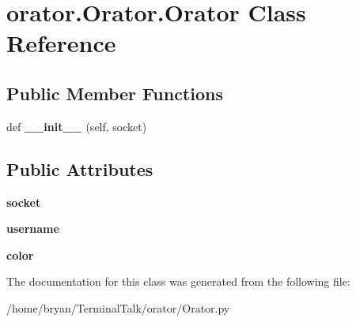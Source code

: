 \hypertarget{classorator_1_1Orator_1_1Orator}{}\section{orator.\+Orator.\+Orator Class Reference}
\label{classorator_1_1Orator_1_1Orator}
\subsection*{Public Member Functions}
\begin{DoxyCompactItemize}
\item 
def {\bfseries \+\_\+\+\_\+init\+\_\+\+\_\+} (self, socket)\hypertarget{classorator_1_1Orator_1_1Orator_a1264cadbc299dfde061e556faaef4053}{}\label{classorator_1_1Orator_1_1Orator_a1264cadbc299dfde061e556faaef4053}

\end{DoxyCompactItemize}
\subsection*{Public Attributes}
\begin{DoxyCompactItemize}
\item 
{\bfseries socket}\hypertarget{classorator_1_1Orator_1_1Orator_a17846e4319220082d3b672b16ee4b91e}{}\label{classorator_1_1Orator_1_1Orator_a17846e4319220082d3b672b16ee4b91e}

\item 
{\bfseries username}\hypertarget{classorator_1_1Orator_1_1Orator_ab609ee5fccd2b25e4b8e275abf6b1b55}{}\label{classorator_1_1Orator_1_1Orator_ab609ee5fccd2b25e4b8e275abf6b1b55}

\item 
{\bfseries color}\hypertarget{classorator_1_1Orator_1_1Orator_ab808cfaed27ea5c2653cac528379d0b2}{}\label{classorator_1_1Orator_1_1Orator_ab808cfaed27ea5c2653cac528379d0b2}

\end{DoxyCompactItemize}


The documentation for this class was generated from the following file\+:\begin{DoxyCompactItemize}
\item 
/home/bryan/\+Terminal\+Talk/orator/Orator.\+py\end{DoxyCompactItemize}
